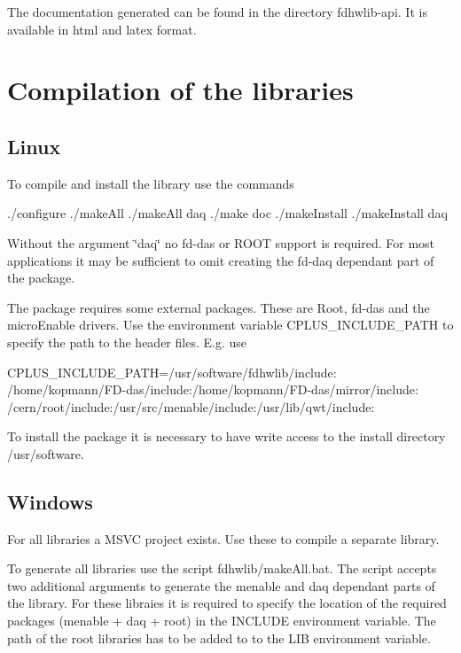 The documentation generated can be found in the directory fdhwlib-\/api. It is available in html and latex format.\hypertarget{index_fdhwlib_build}{}\section{Compilation of the libraries}\label{index_fdhwlib_build}
\hypertarget{index_buildlinux}{}\subsection{Linux}\label{index_buildlinux}
To compile and install the library use the commands \begin{DoxyVerb}./configure
./makeAll
./makeAll daq
./make doc
./makeInstall
./makeInstall daq
\end{DoxyVerb}
 Without the argument \char`\"{}daq\char`\"{} no fd-\/das or R\-O\-O\-T support is required. For most applications it may be sufficient to omit creating the fd-\/daq dependant part of the package.

The package requires some external packages. These are Root, fd-\/das and the micro\-Enable drivers. Use the environment variable C\-P\-L\-U\-S\-\_\-\-I\-N\-C\-L\-U\-D\-E\-\_\-\-P\-A\-T\-H to specify the path to the header files. E.\-g. use \begin{DoxyVerb}CPLUS_INCLUDE_PATH=/usr/software/fdhwlib/include:
       /home/kopmann/FD-das/include:/home/kopmann/FD-das/mirror/include:
       /cern/root/include:/usr/src/menable/include:/usr/lib/qwt/include:
\end{DoxyVerb}
 \begin{DoxyVerb}To install the package it is necessary to have write
access to the install directory /usr/software.
\end{DoxyVerb}
\hypertarget{index_buildwindows}{}\subsection{Windows}\label{index_buildwindows}
For all libraries a M\-S\-V\-C project exists. Use these to compile a separate library.

To generate all libraries use the script fdhwlib/make\-All.\-bat. The script accepts two additional arguments to generate the menable and daq dependant parts of the library. For these libraies it is required to specify the location of the required packages (menable + daq + root) in the I\-N\-C\-L\-U\-D\-E environment variable. The path of the root libraries has to be added to to the L\-I\-B environment variable.

